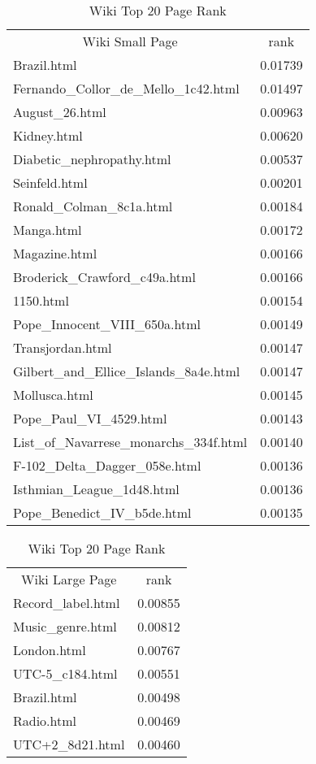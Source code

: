 \documentclass[11pt]{article}
\begin{document}
\begin{table}[h]
\centering
\caption{Wiki Top 20 Page Rank}
\label{tb:wpr} 
\begin{minipage}{.5\textwidth}
\begin{tabular}{lc|}
\multicolumn{1}{c}{Wiki Small Page} & \multicolumn{1}{c|}{rank} \\
Brazil.html & 0.01739 \\
Fernando\_Collor\_de\_Mello\_1c42.html & 0.01497 \\
August\_26.html & 0.00963 \\
Kidney.html & 0.00620 \\
Diabetic\_nephropathy.html & 0.00537 \\
Seinfeld.html & 0.00201 \\
Ronald\_Colman\_8c1a.html & 0.00184 \\
Manga.html & 0.00172 \\
Magazine.html & 0.00166 \\
Broderick\_Crawford\_c49a.html & 0.00166 \\
1150.html & 0.00154 \\
Pope\_Innocent\_VIII\_650a.html & 0.00149 \\
Transjordan.html & 0.00147 \\
Gilbert\_and\_Ellice\_Islands\_8a4e.html & 0.00147 \\
Mollusca.html & 0.00145 \\
Pope\_Paul\_VI\_4529.html & 0.00143 \\
List\_of\_Navarrese\_monarchs\_334f.html & 0.00140 \\
F-102\_Delta\_Dagger\_058e.html & 0.00136 \\
Isthmian\_League\_1d48.html & 0.00136 \\
Pope\_Benedict\_IV\_b5de.html & 0.00135
\end{tabular}
 \end{minipage}%
    \begin{minipage}{0.5\textwidth}
    \begin{tabular}{lc}
\multicolumn{1}{c}{Wiki Large Page} & rank \\
Record\_label.html & 0.00855 \\
Music\_genre.html & 0.00812 \\
London.html & 0.00767 \\
UTC-5\_c184.html & 0.00551 \\
Brazil.html & 0.00498 \\
Radio.html & 0.00469 \\
UTC+2\_8d21.html & 0.00460 \\

\end{tabular}
\end{minipage}
\end{table}
\end{document}
